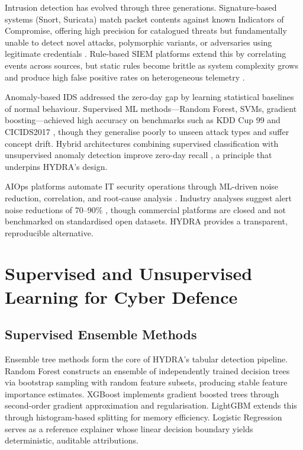 \documentclass[12pt,a4paper]{report}
\begin{document}
Intrusion detection has evolved through three generations. Signature-based systems (Snort, Suricata) match packet contents against known Indicators of Compromise, offering high precision for catalogued threats but fundamentally unable to detect novel attacks, polymorphic variants, or adversaries using legitimate credentials \cite{ahmad2021}. Rule-based SIEM platforms extend this by correlating events across sources, but static rules become brittle as system complexity grows and produce high false positive rates on heterogeneous telemetry \cite{zhu2023}.

Anomaly-based IDS addressed the zero-day gap by learning statistical baselines of normal behaviour. Supervised ML methods---Random Forest, SVMs, gradient boosting---achieved high accuracy on benchmarks such as KDD Cup 99 and CICIDS2017 \cite{aldweesh2020}, though they generalise poorly to unseen attack types and suffer concept drift. Hybrid architectures combining supervised classification with unsupervised anomaly detection improve zero-day recall \cite{alsaedi2020}, a principle that underpins HYDRA's design.

AIOps platforms automate IT security operations through ML-driven noise reduction, correlation, and root-cause analysis \cite{dang2019}. Industry analyses suggest alert noise reductions of 70--90\% \cite{dang2023,fortinet2025}, though commercial platforms are closed and not benchmarked on standardised open datasets. HYDRA provides a transparent, reproducible alternative.

\section{Supervised and Unsupervised Learning for Cyber Defence}
\label{sec:supervised}

\subsection{Supervised Ensemble Methods}
\label{sec:ensemble}

Ensemble tree methods form the core of HYDRA's tabular detection pipeline. Random Forest \cite{breiman2001} constructs an ensemble of independently trained decision trees via bootstrap sampling with random feature subsets, producing stable feature importance estimates. XGBoost \cite{chen2016} implements gradient boosted trees through second-order gradient approximation and regularisation. LightGBM \cite{ke2017} extends this through histogram-based splitting for memory efficiency. Logistic Regression serves as a reference explainer whose linear decision boundary yields deterministic, auditable attributions.
\end{document}

